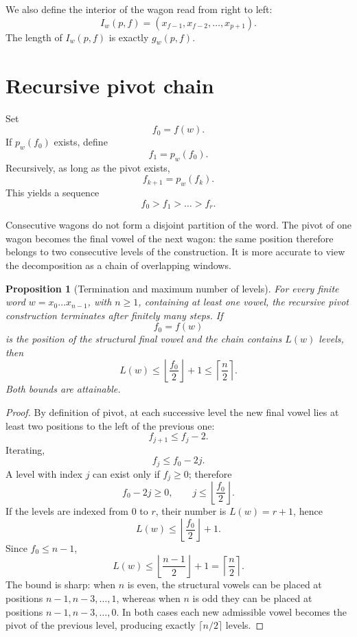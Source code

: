 \documentclass[11pt,a4paper]{article}
\newtheorem{proposition}[theorem]{Proposition}
\theoremstyle{definition}
\theoremstyle{remark}
\newcommand{\Pivot}{p_w}
\newcommand{\Gap}{g_w}
\begin{document}
We also define the interior of the wagon read from right to left:
\[
  I_w(p,f)=(x_{f-1},x_{f-2},\dots,x_{p+1}).
\]
The length of $I_w(p,f)$ is exactly $\Gap(p,f)$.

\section{Recursive pivot chain}

Set
\[
  f_0=f(w).
\]
If $\Pivot(f_0)$ exists, define
\[
  f_1=\Pivot(f_0).
\]
Recursively, as long as the pivot exists,
\[
  f_{k+1}=\Pivot(f_k).
\]
This yields a sequence
\[
  f_0>f_1>\dots>f_r.
\]

Consecutive wagons do not form a disjoint partition of the word. The pivot of one wagon becomes the final vowel of the next wagon: the same position therefore belongs to two consecutive levels of the construction. It is more accurate to view the decomposition as a chain of overlapping windows.

\begin{proposition}[Termination and maximum number of levels]
For every finite word $w=x_0\dots x_{n-1}$, with $n\geq1$, containing at least one vowel, the recursive pivot construction terminates after finitely many steps. If
\[
  f_0=f(w)
\]
is the position of the structural final vowel and the chain contains $L(w)$ levels, then
\[
  L(w)\leq \left\lfloor\frac{f_0}{2}\right\rfloor+1
  \leq \left\lceil\frac{n}{2}\right\rceil.
\]
Both bounds are attainable.
\end{proposition}

\begin{proof}
By definition of pivot, at each successive level the new final vowel lies at least two positions to the left of the previous one:
\[
  f_{j+1}\leq f_j-2.
\]
Iterating,
\[
  f_j\leq f_0-2j.
\]
A level with index $j$ can exist only if $f_j\geq0$; therefore
\[
  f_0-2j\geq0,
  \qquad
  j\leq\left\lfloor\frac{f_0}{2}\right\rfloor.
\]
If the levels are indexed from $0$ to $r$, their number is $L(w)=r+1$, hence
\[
  L(w)\leq\left\lfloor\frac{f_0}{2}\right\rfloor+1.
\]
Since $f_0\leq n-1$,
\[
  L(w)\leq\left\lfloor\frac{n-1}{2}\right\rfloor+1
  =\left\lceil\frac{n}{2}\right\rceil.
\]
The bound is sharp: when $n$ is even, the structural vowels can be placed at positions $n-1,n-3,\dots,1$, whereas when $n$ is odd they can be placed at positions $n-1,n-3,\dots,0$. In both cases each new admissible vowel becomes the pivot of the previous level, producing exactly $\lceil n/2\rceil$ levels.
\end{proof}
\end{document}
